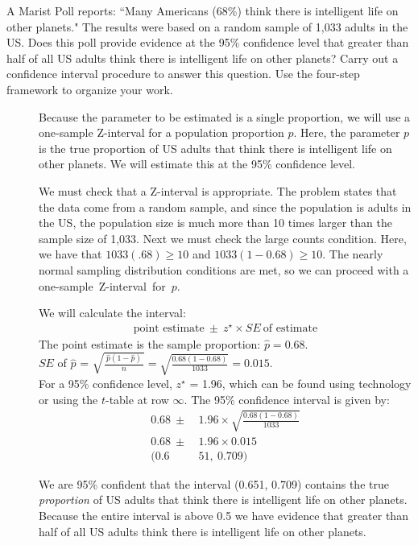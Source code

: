 \begin{examplewrap}
\begin{nexample}{A Marist Poll reports:
    ``Many Americans (68\%) think there is intelligent life on other planets."
    The results were based on a random sample of 1,033 adults in the US.
    Does this poll provide evidence at the 95\% confidence level that greater
    than half of all US adults think there is intelligent life on
    other planets?
    Carry out a confidence interval procedure to answer this question.
    Use the four-step framework to organize your work.}
\label{IntelligentLife}
\begin{description}
\item[]  Because the parameter to be estimated is a single proportion, we will use a one-sample Z-interval for a population proportion $p$.   Here, the parameter $p$ is the true proportion of US adults that think there is intelligent life on other planets.  We will estimate this at the 95\% confidence level.  
\item[] We must check that a Z-interval is appropriate.    The problem states that the data come from a random sample, and since the population is adults in the US, the population size is much more than 10 times larger than the sample size of 1,033.  Next we must check the large counts condition.  Here, we have that $1033(.68)\ge 10$ and $1033(1-0.68)\ge 10$.  The nearly normal sampling distribution conditions are met, so we can proceed with a \mbox{one-sample Z-interval for $p$.}
\item[]  We will calculate the interval:
\begin{align*}
 \text{point estimate}\ \pm\ z^{\star} \times SE\ \text{of estimate}
\end{align*}
The point estimate is the sample proportion: $\hat{p} = 0.68$. \\

$SE$ of $\hat{p}$ = $\sqrt{\frac{\ \hat{p}(1-\hat{p})\ }{n}} = \sqrt{\frac{0.68(1-0.68)}{1033}}=0.015$.  \\

For a 95\% confidence level, $z^{\star}$ = 1.96, which can be found using technology or using the $t$-table at row $\infty$. The 95\% confidence interval is given by:\vspace{-1mm}
\begin{align*}
0.68\ \pm\  &1.96 \times \sqrt{\frac{0.68(1-0.68)}{1033}} \\
0.68\ \pm\  &1.96 \times 0.015 \\
 (0.6&51,\  0.709)
\end{align*}
\item[]  We are 95\% confident that the interval (0.651, 0.709) contains the true \emph{proportion} of US adults that think there is intelligent life on other planets.  Because the entire interval is above 0.5 we have evidence that greater than half of all US adults think there is intelligent life on other planets.
\end{description}
\end{nexample}
\end{examplewrap}

